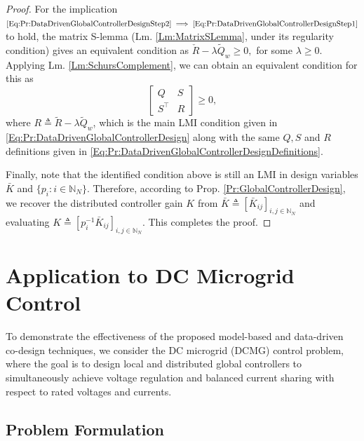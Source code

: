 \documentclass[letterpaper, 10 pt, conference]{ieeeconf}%
\newcommand{\N}{\mathbb{N}}
\newcommand{\T}{\top}
\newcommand{\0}{\mathbf{0}}
\newcommand{\bm}[1]{\begin{bmatrix}#1\end{bmatrix}}
\begin{document}
\begin{proof}
For the implication $\eqref{Eq:Pr:DataDrivenGlobalControllerDesignStep2} \implies \eqref{Eq:Pr:DataDrivenGlobalControllerDesignStep1}$ to hold, the matrix S-lemma (Lm. \ref{Lm:MatrixSLemma}, under its regularity condition) gives an equivalent condition as 
$
\check{R} - \lambda \tilde{Q}_{w} \geq 0,
$
for some $\lambda \geq 0$. Applying Lm. \ref{Lm:SchursComplement}, we can obtain an equivalent condition for this as
$$
\bm{Q & S \\ S^\T & R} \geq 0,
$$
where $R \triangleq  \tilde{R} - \lambda \tilde{Q}_{w}$, which is the main LMI condition given in \eqref{Eq:Pr:DataDrivenGlobalControllerDesign} along with the same $Q, S$ and $R$ definitions given in \eqref{Eq:Pr:DataDrivenGlobalControllerDesignDefinitions}. 

Finally, note that the identified condition above is still an LMI in design variables $\bar{K}$ and $\{p_i: i\in\N_N\}$. Therefore, according to Prop. \ref{Pr:GlobalControllerDesign}, we recover the distributed controller gain $K$ from $\bar{K}\triangleq [\bar{K}_{ij}]_{i,j\in\N_N}$ and evaluating $K \triangleq [p_i^{-1} \bar{K}_{ij}]_{i,j\in\N_N}$. This completes the proof.
\end{proof}


\section{Application to DC Microgrid Control}\label{Sec:Results}

To demonstrate the effectiveness of the proposed model-based and data-driven co-design techniques, we consider the DC microgrid (DCMG) control problem, where the goal is to design local and distributed global controllers to simultaneously achieve voltage regulation and balanced current sharing with respect to rated voltages and currents. 



\subsection{Problem Formulation}
\end{document}
